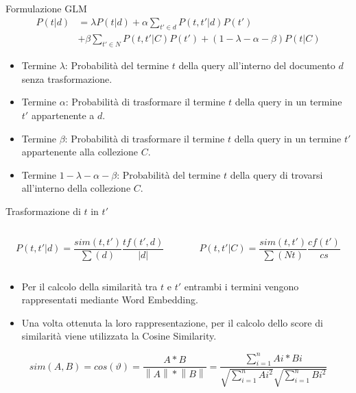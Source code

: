 \begin{frame}{Formulazione GLM}
    \setlength{\abovedisplayskip}{1pt}
    \setlength{\belowdisplayskip}{1pt}
    \[
        \begin{split}
            P(t|d) & = \lambda P(t|d) + \alpha \sum_{{t}'\in d}P(t,{t}'|d)P({t}')\\
            & + \beta \sum_{{t}'\in N}P(t,{t}'|C)P({t}') + (1-\lambda-\alpha-\beta)P(t|C)
        \end{split}
    \]
    \begin{itemize}
        \item Termine \(\lambda\): Probabilità del termine \(t\) della query all'interno del documento \(d\) senza trasformazione.
        \item Termine \(\alpha\): Probabilità di trasformare il termine \(t\) della query in un termine \({t}'\) appartenente a \(d\).
        \item Termine \(\beta\): Probabilità di trasformare il termine \(t\) della query in un termine \({t}'\) appartenente alla collezione \(C\).
        \item Termine \(1-\lambda-\alpha-\beta\): Probabilità del termine \(t\) della query di trovarsi all'interno della collezione \(C\).
    \end{itemize}
\end{frame}

\begin{frame}{Trasformazione di \(t\) in \({t}'\)}
    
    \begin{columns}
        \begin{column}{0.5\textwidth}
            \[P(t,t'|d) = \frac{sim(t,t')}{\sum (d)}\frac{tf(t',d)}{|d|}\]
        \end{column}
        \begin{column}{0.5\textwidth}
            \[P(t,t'|C) = \frac{sim(t,t')}{\sum (Nt)}\frac{cf(t')}{cs}\]
        \end{column}
    \end{columns}

    \bigskip
    \begin{itemize}
        \item Per il calcolo della similarità tra \(t\) e \({t}'\) entrambi i termini vengono rappresentati mediante Word Embedding.
        \item Una volta ottenuta la loro rappresentazione, per il calcolo dello score di similarità viene utilizzata la Cosine Similarity.
    \end{itemize}

    \[sim(A,B) = cos(\vartheta ) = \frac{A * B}{\left \| A \right \| * \left \| B \right \|} = \frac{\sum_{i=1}^{n} Ai * Bi}{\sqrt{\sum_{i=1}^{n}Ai^{2}}\sqrt{\sum_{i=1}^{n}Bi^{2}}}\]

\end{frame}

